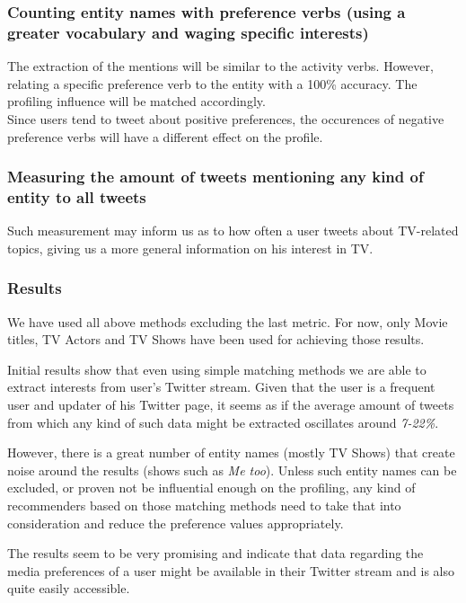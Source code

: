 \documentclass{article}
\begin{document}
\subsubsection{Counting entity names with preference verbs (using a greater vocabulary
      and waging specific interests)}

The extraction of the mentions will be similar to the activity verbs. However,
    relating a specific preference verb to the entity with a 100\% accuracy. The
    profiling influence will be matched accordingly. \\
Since users tend to tweet about positive preferences, the occurences of negative
preference verbs will have a different effect on the profile.

\subsubsection{Measuring the amount of tweets mentioning any kind of entity to all
  tweets}

Such measurement may inform us as to how often a user tweets about TV-related
topics, giving us a more general information on his interest in TV.

\subsubsection{Results}
We have used all above methods excluding the last metric. For now, only Movie titles, TV Actors and TV Shows have been used for achieving
those results.

Initial results show that even using simple matching methods we are able to extract interests from
user's Twitter stream. Given that the user is a frequent user and updater of his Twitter page, it seems
as if the average amount of tweets from which any kind of such data might be extracted oscillates around \textit{7-22\%}.

However, there is a great number of entity names (mostly TV Shows) that create noise around the results (shows such as \textit{Me too}).
Unless such entity names can be excluded, or proven not be influential enough on the profiling, any kind of recommenders based on
those matching methods need to take that into consideration and reduce the preference values appropriately.

The results seem to be very promising and indicate that data regarding the media preferences of a user might be available in their Twitter stream
and is also quite easily accessible. 
\end{document}
